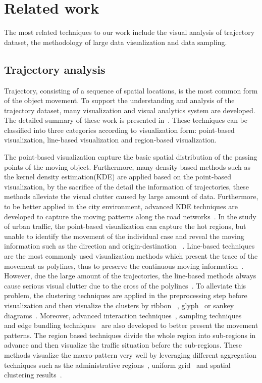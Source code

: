 \section{Related work}
The most related techniques to our work include the visual analysis of trajectory dataset, the methodology of large data visualization and data sampling. 
\subsection{Trajectory analysis}
Trajectory, consisting of a sequence of spatial locations, is the most common form of the object movement. To support the understanding and analysis of the trajectory dataset, many visualization and visual analytics system are developed. The detailed summary of these work is presented in~\cite{chen2015survey}. These techniques can be classified into three categories according to visualization form: point-based visualization, line-based visualization and region-based visualization. 

The point-based visualization capture the basic spatial distribution of the passing points of the moving object\cite{}. Furthermore, many density-based methods such as the kernel density estimation(KDE) are applied based on the point-based visualization, by the sacrifice of the detail the information of trajectories, these methods alleviate the visual clutter caused by large amount of data. 
Furthermore, to be better applied in the city environment, advanced KDE techniques are developed to capture the moving patterns along the road networks~\cite{}. In the study of urban traffic, the point-based visualization can capture the hot regions, but unable to identify the movement of the individual case and reveal the moving information such as the direction and origin-destination ~\cite{chen2015survey}. Line-based techniques are the most commonly used visualization methods which present the trace of the movement as polylines, thus to preserve the continuous moving information~\cite{}. However, due the large amount of the trajectories, the line-based methods always cause serious visual clutter due to the cross of the polylines~\cite{}. To alleviate this problem, the clustering techniques are applied in the preprocessing step before visualization and then visualize the clusters by ribbon ~\cite{},  glyph~\cite{} or sankey diagrams~\cite{}. Moreover, advanced interaction techniques~\cite{}, sampling techniques~\cite{} and edge bundling techniques~\cite{zeng2019route} are also developed to better present the movement patterns. The region based techniques divide the whole region into sub-regions in advance and then visualize the traffic situation before the sub-regions. These methods visualize the macro-pattern very well by leveraging different aggregation techniques such as the administrative regions~\cite{}, uniform grid~\cite{} and spatial clustering results~\cite{}.



